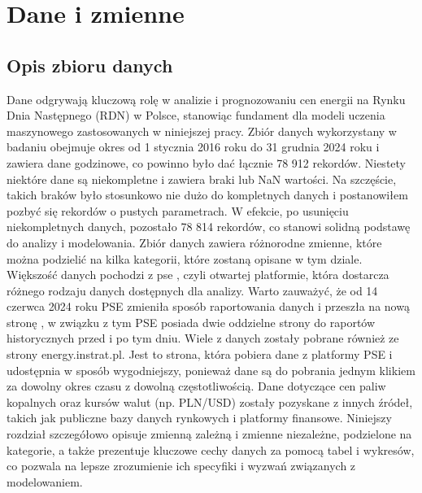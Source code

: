 \chapter{Dane i zmienne}
\label{ch:dane}

\section{Opis zbioru danych}
Dane odgrywają kluczową rolę w analizie i prognozowaniu cen energii na Rynku Dnia Następnego (RDN) w Polsce, stanowiąc fundament dla modeli uczenia maszynowego zastosowanych w niniejszej pracy. Zbiór danych wykorzystany w badaniu obejmuje okres od 1 stycznia 2016 roku do 31 grudnia 2024 roku i zawiera dane godzinowe, co powinno było dać łącznie 78 912 rekordów. Niestety niektóre dane są niekompletne i zawiera braki lub NaN wartości. Na szczęście, takich braków było stosunkowo nie dużo do kompletnych danych i postanowiłem pozbyć się rekordów o pustych parametrach. W efekcie, po usunięciu niekompletnych danych, pozostało 78 814 rekordów, co stanowi solidną podstawę do analizy i modelowania. Zbiór danych zawiera różnorodne zmienne, które można podzielić na kilka kategorii, które zostaną opisane w tym dziale. Większość danych pochodzi z \gls{pse} \cite{PSEOLD}, czyli otwartej platformie, która dostarcza różnego rodzaju danych dostępnych dla analizy. Warto zauważyć, że od 14 czerwca 2024 roku PSE zmieniła sposób raportowania danych i przeszła na nową stronę \cite{PSENEW}, w związku z tym PSE posiada dwie oddzielne strony do raportów historycznych przed i po tym dniu. Wiele z danych zostały pobrane również ze strony energy.instrat.pl. Jest to strona, która pobiera dane z platformy PSE i udostępnia w sposób wygodniejszy, ponieważ dane są do pobrania jednym klikiem za dowolny okres czasu z dowolną częstotliwością. Dane dotyczące cen paliw kopalnych oraz kursów walut (np. PLN/USD) zostały pozyskane z innych źródeł, takich jak publiczne bazy danych rynkowych i platformy finansowe. Niniejszy rozdział szczegółowo opisuje zmienną zależną i zmienne niezależne, podzielone na kategorie, a także prezentuje kluczowe cechy danych za pomocą tabel i wykresów, co pozwala na lepsze zrozumienie ich specyfiki i wyzwań związanych z modelowaniem.

